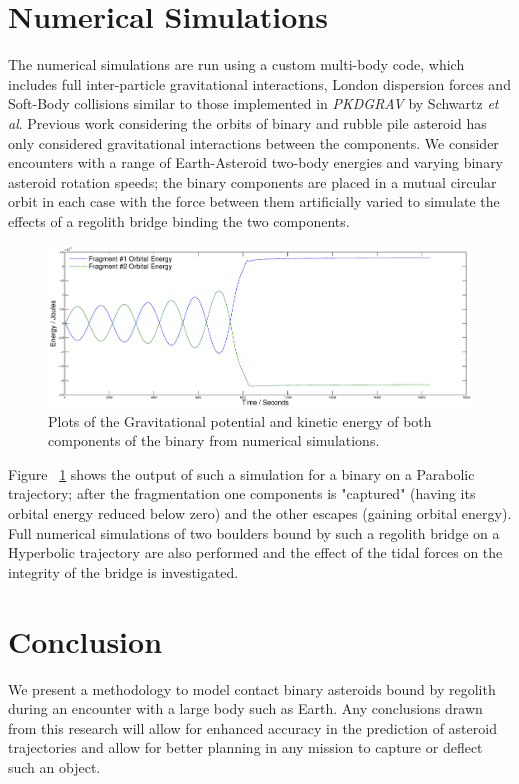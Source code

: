 \documentclass[letterpaper, preprint, paper,11pt]{AAS}	%
\begin{document}
\section{Numerical Simulations}
The numerical simulations are run using a custom multi-body code, which includes full inter-particle gravitational interactions, London dispersion forces and Soft-Body collisions similar to those implemented in \textit{PKDGRAV} by Schwartz \textit{et al}\cite{soft}.
Previous work considering the orbits of binary and rubble pile asteroid has only considered gravitational interactions between the components. We consider encounters with a range of Earth-Asteroid two-body energies and varying binary asteroid rotation speeds; the binary components are placed in a mutual circular orbit in each case with the force between them artificially varied to simulate the effects of a regolith bridge binding the two components.
\begin{figure}[H]
\centering
\includegraphics[width=1.2\textwidth]{binary_num.eps} 
\caption{Plots of the Gravitational potential and kinetic energy of both components of the binary from numerical simulations.} 
\label{fig:Num}
\end{figure}
 Figure ~\ref{fig:Num} shows the output of such a simulation for a binary on a Parabolic trajectory; after the fragmentation one components is "captured" (having its orbital energy reduced below zero) and the other escapes (gaining orbital energy).  
Full numerical simulations of two boulders bound by such a regolith bridge on a Hyperbolic trajectory are also performed and the effect of the tidal forces on the integrity of the bridge is investigated.


\section{Conclusion}
We present a methodology to model contact binary asteroids bound by regolith during an encounter with a large body such as Earth. Any conclusions drawn from this research will allow for enhanced accuracy in the prediction of asteroid trajectories and allow for better planning in any mission to capture or deflect such an object.

\end{document}

